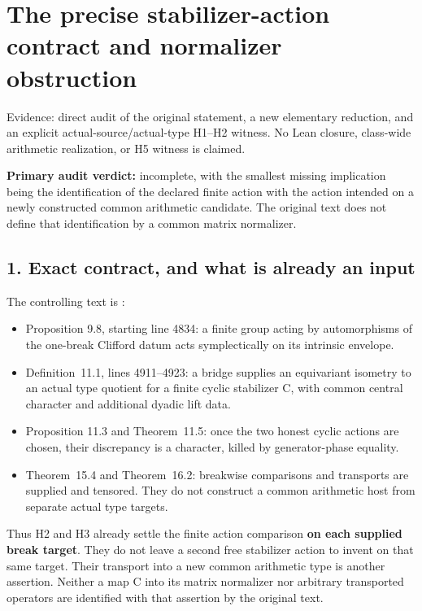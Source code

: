 \clearpage
\section{The precise stabilizer-action contract and normalizer obstruction}\label{app:stabilizer_contract}

Evidence: direct audit of the original statement, a new elementary
reduction, and an explicit actual-source/actual-type H1--H2 witness.
No Lean closure, class-wide arithmetic
realization, or H5 witness is claimed.

\textbf{Primary audit verdict:} incomplete, with the smallest missing
implication being the identification of the declared finite action with
the action intended on a newly constructed common arithmetic candidate.
The original text does not define that identification by a common matrix
normalizer.

\hypertarget{stabilizer_contract-exact-contract-and-what-is-already-an-input}{%
\subsection{1. Exact contract, and what is already an
input}\label{stabilizer_contract-exact-contract-and-what-is-already-an-input}}

The controlling text is
:

\begin{itemize}
\tightlist
\item
  Proposition 9.8, starting line 4834: a finite group acting by
  automorphisms of the one-break Clifford datum acts symplectically on
  its intrinsic envelope.
\item
  Definition~11.1, lines 4911--4923: a bridge supplies an equivariant
  isometry to an actual type quotient for a finite cyclic stabilizer C,
  with common central character and additional dyadic lift data.
\item
  Proposition 11.3 and Theorem~11.5: once the two honest cyclic actions
  are chosen, their discrepancy is a character, killed by
  generator-phase equality.
\item
  Theorem~15.4 and Theorem~16.2: breakwise comparisons and transports are
  supplied and tensored. They do not construct a common arithmetic host
  from separate actual type targets.
\end{itemize}

Thus H2 and H3 already settle the finite action comparison \textbf{on
each supplied break target}. They do not leave a second free stabilizer
action to invent on that same target. Their transport into a new common
arithmetic type is another assertion. Neither a map C into its matrix
normalizer nor arbitrary transported operators are identified with that
assertion by the original text.

